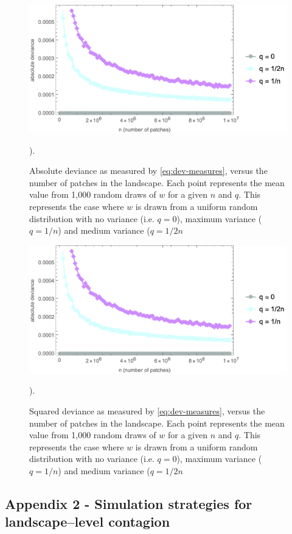 \begin{figure}[!hpt]
    \centering
    \includegraphics[width=0.8\linewidth]{figs/si/patch-weight-convergence/absPlotAll.png}
    \caption{Absolute deviance as measured by \cref{eq:dev-measures}, versus the number of patches in the landscape. Each point represents the mean value from 1,000 random draws of $w$ for a given $n$ and $q$. This represents the case where $w$ is drawn from a uniform random distribution with no variance (i.e. $q=0$), maximum variance ($q=1/n$) and medium variance ($q=1/2n$}). 
    \label{fig:patch-weight-abs}
\end{figure}
\begin{figure}[!hpt]
    \centering
    \includegraphics[width=0.8\linewidth]{figs/si/patch-weight-convergence/absPlotAll.png}
    \caption{Squared deviance as measured by \cref{eq:dev-measures}, versus the number of patches in the landscape. Each point represents the mean value from 1,000 random draws of $w$ for a given $n$ and $q$. This represents the case where $w$ is drawn from a uniform random distribution with no variance (i.e. $q=0$), maximum variance ($q=1/n$) and medium variance ($q=1/2n$}). 
    \label{fig:patch-weight-sq}
\end{figure}
\newpage

\subsection*{Appendix 2 - Simulation strategies for landscape--level contagion}\label{app:app-2}

